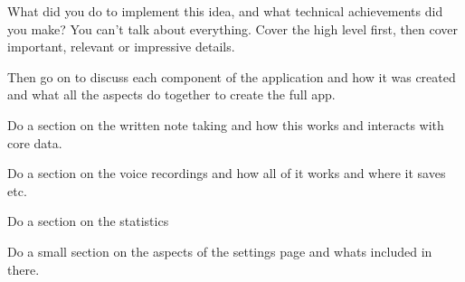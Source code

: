 \documentclass{l4proj}
\begin{document}
What did you do to implement this idea, and what technical achievements did you make?
You can't talk about everything. Cover the high level first, then cover important, relevant or impressive details.
\par 
Then go on to discuss each component of the application and how it was created and what all the aspects do
together to create the full app. 
\par 
Do a section on the written note taking and how this works and interacts with core data.
\par 
Do a section on the voice recordings and how all of it works and where it saves etc.
\par 
Do a section on the statistics 
\par 
Do a small section on the aspects of the settings page and whats included in there.






\end{document}
